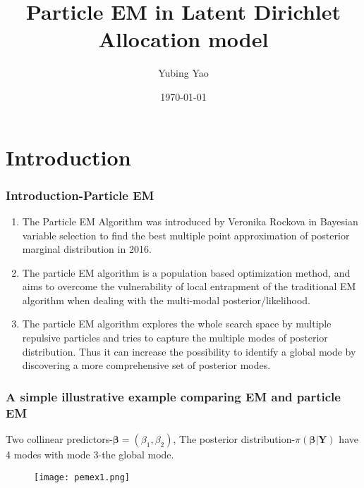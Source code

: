 \documentclass[10pt]{beamer}
\title{Particle EM in Latent Dirichlet Allocation model}
\author{Yubing Yao}
\date{\today}
\newcommand{\bs}{\boldsymbol}
\begin{document}
	\maketitle{}
	\vfill
	\section{Introduction}

\begin{frame}
	\frametitle{Introduction-Particle EM}
	\begin{enumerate}
		\item The Particle EM Algorithm was introduced by Veronika Rockova in Bayesian variable selection to find the best multiple point approximation of posterior marginal distribution in 2016. 
	\vspace{2ex}
		\item The particle EM algorithm is a population based optimization method, and aims to overcome the vulnerability of local entrapment of the traditional EM algorithm when dealing with the multi-modal posterior/likelihood.
			\vspace{2ex}
		\item The particle EM algorithm explores the whole search space by multiple repulsive particles and tries to capture the multiple modes of posterior distribution. Thus it can increase the possibility to identify a global mode by discovering a more comprehensive set of posterior modes.
		
		
	\end{enumerate}
\end{frame}
\begin{frame}
	\frametitle{A simple illustrative example comparing EM and particle EM}
	Two collinear predictors-$\bs{\beta}=(\beta_1,\beta_2)$, The posterior distribution-$\pi(\bs{\beta}|\bs{Y})$ have 4 modes with mode 3-the global mode.
	\begin{figure}[b]
		\texttt{[image: pemex1.png]}
		\centering
	\end{figure}
\end{frame}
\end{document}
